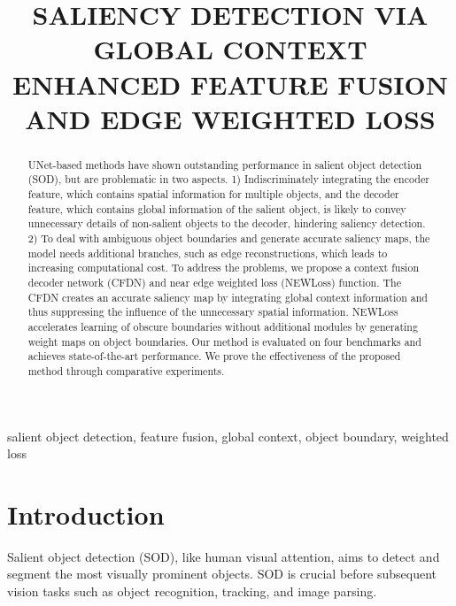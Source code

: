 \documentclass{article}
\title{SALIENCY DETECTION VIA GLOBAL CONTEXT ENHANCED FEATURE FUSION\\ AND EDGE WEIGHTED LOSS}
\begin{document}
\maketitle
\begin{abstract}
UNet-based methods have shown outstanding performance in salient object detection (SOD), but are problematic in two aspects. 1) Indiscriminately integrating the encoder feature, which contains spatial information for multiple objects, and the decoder feature, which contains global information of the salient object, is likely to convey unnecessary details of non-salient objects to the decoder, hindering saliency detection. 2) To deal with ambiguous object boundaries and generate accurate saliency maps, the model needs additional branches, such as edge reconstructions, which leads to increasing computational cost. To address the problems, we propose a context fusion decoder network (CFDN) and near edge weighted loss (NEWLoss) function. The CFDN creates an accurate saliency map by integrating global context information and thus suppressing the influence of the unnecessary spatial information. NEWLoss accelerates learning of obscure boundaries without additional modules by generating weight maps on object boundaries. Our method is evaluated on four benchmarks and achieves state-of-the-art performance. We prove the effectiveness of the proposed method through comparative experiments.


\end{abstract}

\begin{keywords}
salient object detection, feature fusion, global context, object boundary, weighted loss
\end{keywords}
\vspace{-0.1cm}
\section{Introduction}
\label{sec:intro}
\vspace{-0.1cm}
Salient object detection (SOD), like human visual attention, aims to detect and segment the most visually prominent objects. SOD is crucial before subsequent vision tasks such as object recognition, tracking, and image parsing.
\end{document}

